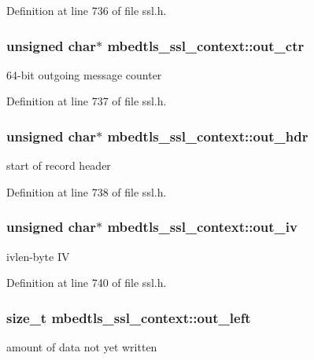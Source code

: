 Definition at line 736 of file ssl.\-h.

\hypertarget{structmbedtls__ssl__context_aa738cee1fd289e5c8686ab355d591203}{
\subsubsection[{out\-\_\-ctr}]{\setlength{\rightskip}{0pt plus 5cm}unsigned char$\ast$ mbedtls\-\_\-ssl\-\_\-context\-::out\-\_\-ctr}}\label{structmbedtls__ssl__context_aa738cee1fd289e5c8686ab355d591203}
64-\/bit outgoing message counter 

Definition at line 737 of file ssl.\-h.

\hypertarget{structmbedtls__ssl__context_a02d820fa0a4f09e5b5a69b71de4cc125}{
\subsubsection[{out\-\_\-hdr}]{\setlength{\rightskip}{0pt plus 5cm}unsigned char$\ast$ mbedtls\-\_\-ssl\-\_\-context\-::out\-\_\-hdr}}\label{structmbedtls__ssl__context_a02d820fa0a4f09e5b5a69b71de4cc125}
start of record header 

Definition at line 738 of file ssl.\-h.

\hypertarget{structmbedtls__ssl__context_ab2e382571a395990024d82a47dadf565}{
\subsubsection[{out\-\_\-iv}]{\setlength{\rightskip}{0pt plus 5cm}unsigned char$\ast$ mbedtls\-\_\-ssl\-\_\-context\-::out\-\_\-iv}}\label{structmbedtls__ssl__context_ab2e382571a395990024d82a47dadf565}
ivlen-\/byte I\-V 

Definition at line 740 of file ssl.\-h.

\hypertarget{structmbedtls__ssl__context_a8b9ef7c3cfd17efdc2eacddf4dbfb409}{
\subsubsection[{out\-\_\-left}]{\setlength{\rightskip}{0pt plus 5cm}size\-\_\-t mbedtls\-\_\-ssl\-\_\-context\-::out\-\_\-left}}\label{structmbedtls__ssl__context_a8b9ef7c3cfd17efdc2eacddf4dbfb409}
amount of data not yet written 

